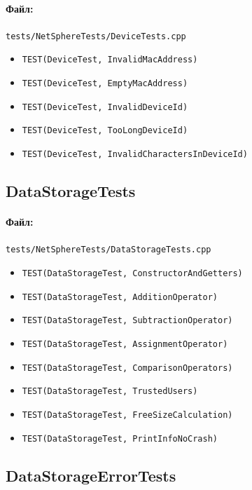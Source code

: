 \documentclass[14pt,a4paper]{extarticle}
\begin{document}
\paragraph{Файл:} \texttt{tests/NetSphereTests/DeviceTests.cpp}
\begin{itemize}
  \item \texttt{TEST(DeviceTest, InvalidMacAddress)}
  \item \texttt{TEST(DeviceTest, EmptyMacAddress)}
  \item \texttt{TEST(DeviceTest, InvalidDeviceId)}
  \item \texttt{TEST(DeviceTest, TooLongDeviceId)}
  \item \texttt{TEST(DeviceTest, InvalidCharactersInDeviceId)}
\end{itemize}

\subsection{DataStorageTests}
\paragraph{Файл:} \texttt{tests/NetSphereTests/DataStorageTests.cpp}
\begin{itemize}
  \item \texttt{TEST(DataStorageTest, ConstructorAndGetters)}
  \item \texttt{TEST(DataStorageTest, AdditionOperator)}
  \item \texttt{TEST(DataStorageTest, SubtractionOperator)}
  \item \texttt{TEST(DataStorageTest, AssignmentOperator)}
  \item \texttt{TEST(DataStorageTest, ComparisonOperators)}
  \item \texttt{TEST(DataStorageTest, TrustedUsers)}
  \item \texttt{TEST(DataStorageTest, FreeSizeCalculation)}
  \item \texttt{TEST(DataStorageTest, PrintInfoNoCrash)}
\end{itemize}

\subsection{DataStorageErrorTests}
\end{document}
